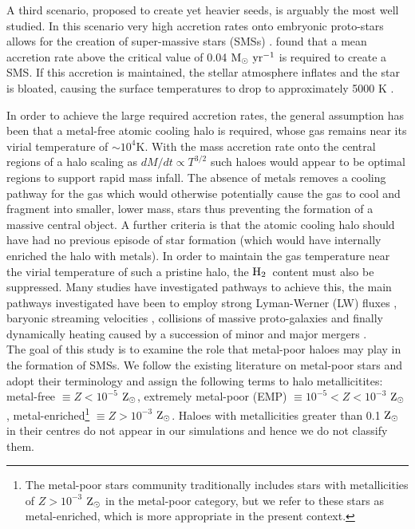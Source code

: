\documentclass[graphics, twocolumn, usenatbib]{mn2e}
\newcommand{\msolaryr} {$\rm{M_{\odot}~yr^{-1}}~$}
\newcommand{\zsolar} {$\rm{Z_{\odot}}~$}
\newcommand{\zsolarc} {$\rm{Z_{\odot}}$}
\newcommand{\molH} {$\rm{H_2}$~}
\begin{document}
\indent A third scenario, proposed to create yet heavier seeds, is arguably the most well studied. In this scenario very high accretion rates onto embryonic proto-stars allows for the creation of super-massive stars (SMSs)
\citep{Shapiro_1979, Begelman_2008, Schleicher_2013, Hosokawa_2013, Inayoshi_2014, Sakurai_2016,
  Umeda_2016, Haemmerle_2017,Woods_2017, Woods_2018, Regan_2018b}. \cite{Sakurai_2016} found
that a mean accretion rate above the critical value of 0.04 \msolaryr is required to create a SMS.
If this accretion is maintained, the stellar atmosphere inflates and the star is bloated, causing the surface temperatures to drop to approximately 5000 K \citep{Hosokawa_2013, Haemmerle_2017,Woods_2017}. 

In order to achieve the large required accretion rates, the general assumption has been
that a metal-free atomic cooling halo is required, whose gas remains near its virial temperature of $\sim10^4$K.
With the mass accretion rate onto the central regions of a halo scaling as $dM/dt \propto T^{3/2}$ such haloes would appear
to be optimal regions to support rapid mass infall. The absence of metals removes a cooling pathway for
the gas which would otherwise potentially cause the gas to cool and fragment into smaller, lower
mass, stars thus preventing the formation of a massive central object. A further criteria is that the
atomic cooling halo should have had no previous episode of star formation (which would have
internally enriched the halo with metals). In order to maintain the gas temperature near the virial temperature of such a pristine halo, the \molH content
must also be suppressed. Many studies have investigated pathways to achieve this, the main pathways
investigated have been to employ strong Lyman-Werner (LW) fluxes \citep{Dijkstra_2008, Shang_2010,
  Regan_2014b, Latif_2014b, Agarwal_2015a, Latif_2015, Regan_2016a, Regan_2017, Regan_2018a},
baryonic streaming velocities
\citep{Tseliakhovich_2010, Tanaka_2014, Hirano_2017, Schauer_2017}, collisions of massive
proto-galaxies \citep{Mayer_2010, Mayer_2014, Inayoshi_2015} and finally dynamically heating caused
by a succession of minor and major mergers \citep{Yoshida_2003a, Fernandez_2014, Wise_2019}. \\
\indent The goal of this study is to examine the role that metal-poor haloes may play in the
formation of SMSs. We follow the existing literature on metal-poor stars \citep[e.g.][]{Frebel_2015}
and adopt their terminology and assign the following terms to halo metallicitites:
metal-free $\equiv Z < 10^{-5}$ \zsolarc,
extremely metal-poor (EMP) $\equiv 10^{-5} < Z < 10^{-3}$ \zsolarc,
metal-enriched\footnote{The metal-poor stars community traditionally includes stars with
  metallicities of $Z > 10^{-3}$ \zsolar in the metal-poor category, but we refer to these stars as metal-enriched, which 
  is more appropriate in the present context.} $\equiv Z > 10^{-3}$ \zsolarc. Haloes with metallicities 
greater than 0.1 \zsolarc in their centres do not appear in our simulations and hence we do not
classify them.
\end{document}
